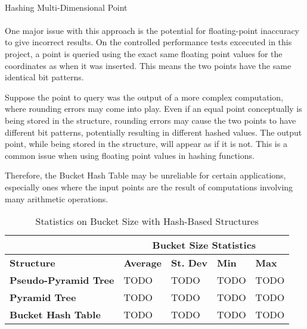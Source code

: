 \paragraph{}

\begin{algorithm}[H]
	\SetAlgoLined
	 

  	 {
	}

	\caption{Hashing Multi-Dimensional Point}
	\label{alg:point-hashing}
\end{algorithm}

\paragraph{}

One major issue with this approach is the potential for floating-point inaccuracy to give incorrect results. On the controlled performance tests excecuted in this project, a point is queried using the exact same floating point values for the coordinates as when it was inserted. This means the two points have the same identical bit patterns. 

Suppose the point to query was the output of a more complex computation, where rounding errors may come into play. Even if an equal point conceptually is being stored in the structure, rounding errors may cause the two points to have different bit patterns, potentially resulting in different hashed values. The output point, while being stored in the structure, will appear as if it is not. This is a common issue when using floating point values in hashing functions.

Therefore, the Bucket Hash Table may be unreliable for certain applications, especially ones where the input points are the result of computations involving many arithmetic operations.

\begin{table}
	\centering
	\begin{tabular}{|l|l|l|l|l|}
		\hline
		\textbf{} & \multicolumn{4}{c|}{\textbf{Bucket Size Statistics}} \\
		\hline
		\textbf{Structure} & \textbf{Average} & \textbf{St. Dev} & \textbf{Min} & \textbf{Max} \\
		\hline
		\textbf{Pseudo-Pyramid Tree} & TODO & TODO & TODO & TODO \\
		\textbf{Pyramid Tree} & TODO & TODO & TODO & TODO \\
		\textbf{Bucket Hash Table} & TODO & TODO & TODO & TODO \\
		\hline
	\end{tabular}
	\caption{Statistics on Bucket Size with Hash-Based Structures}
	\label{tab:it2-bucket-stats}
\end{table}

